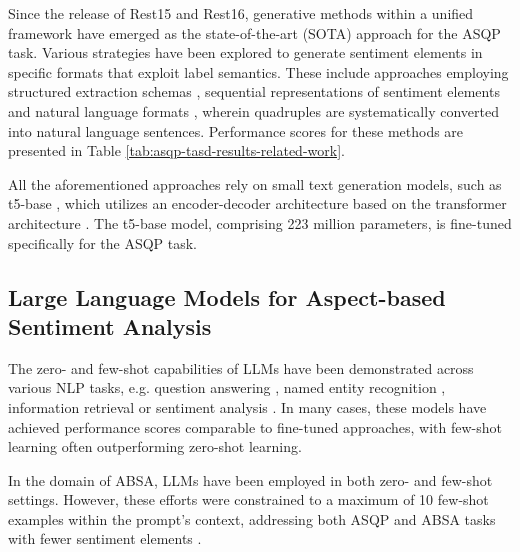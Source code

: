 Since the release of Rest15 and Rest16, generative methods within a unified framework have emerged as the state-of-the-art (SOTA) approach for the ASQP task. Various strategies have been explored to generate sentiment elements in specific formats that exploit label semantics. These include approaches employing structured extraction schemas \citep{lu2022unified}, sequential representations of sentiment elements \citep{gou2023mvp} and natural language formats \citep{gou2023mvp,liu2021solving}, wherein quadruples are systematically converted into natural language sentences. Performance scores for these methods are presented in Table \ref{tab:asqp-tasd-results-related-work}.

All the aforementioned approaches rely on small text generation models, such as t5-base \citep{raffel2020exploring}, which utilizes an encoder-decoder architecture based on the transformer architecture \cite{vaswani2017attention}. The t5-base model, comprising 223 million parameters, is fine-tuned specifically for the ASQP task.

\subsection{Large Language Models for Aspect-based Sentiment Analysis}

The zero- and few-shot capabilities of LLMs have been demonstrated across various NLP tasks, e.g. question answering \citep{chada2021fewshotqa, brown2020language}, named entity recognition \citep{cheng2024novel, wang2023gpt}, information retrieval \citep{faggioli2023perspectives, wang2022recognizing} or sentiment analysis \citep{zhang2024sentiment}. In many cases, these models have achieved performance scores comparable to fine-tuned approaches, with few-shot learning often outperforming zero-shot learning.

In the domain of ABSA, LLMs have been employed in both zero- and few-shot settings. However, these efforts were constrained to a maximum of 10 few-shot examples within the prompt's context, addressing both ASQP and ABSA tasks with fewer sentiment elements \citep{conneau2019unsupervised, gou2023mvp, zhang2024sentiment}.


